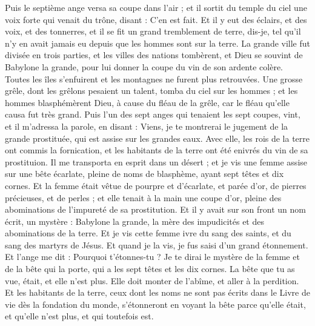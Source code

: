 \begin{multicols}{2}
Puis le septième ange versa sa coupe dans l'air ; et il sortit du temple du ciel une voix forte qui venait du trône, disant : C'en est fait.
Et il y eut des éclairs, et des voix, et des tonnerres, et il se fit un grand tremblement de terre, dis-je, tel qu'il n'y en avait jamais eu depuis que les hommes sont sur la terre.
La grande ville fut divisée en trois parties, et les villes des nations tombèrent, et Dieu se souvint de Babylone la grande, pour lui donner la coupe du vin de son ardente colère.
Toutes les îles s'enfuirent et les montagnes ne furent plus retrouvées.
Une grosse grêle, dont les grêlons pesaient un talent, tomba du ciel sur les hommes ; et les hommes blasphémèrent Dieu, à cause du fléau de la grêle, car le fléau qu'elle causa fut très grand.
\VerseOne{}Puis l'un des sept anges qui tenaient les sept coupes, vint, et il m'adressa la parole, en disant : Viens, je te montrerai le jugement de la grande prostituée, qui est assise sur les grandes eaux.
Avec elle, les rois de la terre ont commis la fornication, et les habitants de la terre ont été enivrés du vin de sa prostituion.
Il me transporta en esprit dans un désert ; et je vis une femme assise sur une bête écarlate, pleine de noms de blasphème, ayant sept têtes et dix cornes.
Et la femme était vêtue de pourpre et d'écarlate, et parée d'or, de pierres précieuses, et de perles ; et elle tenait à la main une coupe d'or, pleine des abominations de l'impureté de sa prostitution.
Et il y avait sur son front un nom écrit, un mystère : Babylone la grande, la mère des impudicités et des abominations de la terre.
Et je vis cette femme ivre du sang des saints, et du sang des martyrs de Jésus. Et quand je la vis, je fus saisi d'un grand étonnement.
Et l'ange me dit : Pourquoi t'étonnes-tu ? Je te dirai le mystère de la femme et de la bête qui la porte, qui a les sept têtes et les dix cornes.
La bête que tu as vue, était, et elle n'est plus. Elle doit monter de l'abîme, et aller à la perdition. Et les habitants de la terre, ceux dont les noms ne sont pas écrits dans le Livre de vie dès la fondation du monde, s'étonneront en voyant la bête parce qu'elle était, et qu'elle n'est plus, et qui toutefois est.

\end{multicols}
